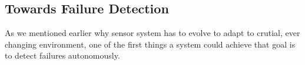 \subsection{Towards Failure Detection}

As we mentioned earlier why sensor system has to evolve to adapt to crutial,
ever changing environment, one of the first things a system could achieve that
goal is to detect failures autonomously.


